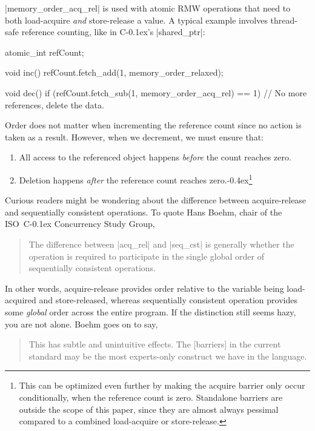 \documentclass[fontsize=10pt, oneside]{scrartcl}
\newcommand{\punckern}{\kern-0.4ex}
\newcommand{\cplusplus}[1]{C\kern-0.1ex\raisebox{0.15ex}{\texttt{++}}}
\begin{document}
\cc|memory_order_acq_rel| is used with atomic \textsc{RMW} operations that need to both load-acquire \emph{and} store-release a value.
A typical example involves thread-safe reference counting,
like in \cplusplus{}'s \cpp|shared_ptr|:
\begin{cppcode}
atomic_int refCount;

void inc()
{
    refCount.fetch_add(1, memory_order_relaxed);
}
\end{cppcode}
\begin{cppcode}
void dec()
{
    if (refCount.fetch_sub(1, memory_order_acq_rel) == 1) {
        // No more references, delete the data.
    }
}
\end{cppcode}

Order does not matter when incrementing the reference count since no action is taken as a result.
However, when we decrement, we must ensure that:
\begin{enumerate}
  \item All access to the referenced object happens \emph{before} the count reaches zero.
  \item Deletion happens \emph{after} the reference count reaches zero.\punckern\footnote{%
        This can be optimized even further by making the acquire barrier only occur conditionally,
        when the reference count is zero.
        Standalone barriers are outside the scope of this paper,
        since they are almost always pessimal compared to a combined load-acquire or store-release.}
\end{enumerate}

Curious readers might be wondering about the difference between acquire-release and sequentially consistent operations.
To quote Hans Boehm, chair of the ISO~\cplusplus{} Concurrency Study Group,
\begin{quote}
\small
The difference between \cc|acq_rel| and \cc|seq_cst| is generally whether the operation is required to participate in the single global order of sequentially consistent operations.
\end{quote}
In other words, acquire-release provides order relative to the variable being load-acquired and store-released,
whereas sequentially consistent operation provides some \emph{global} order across the entire program.
If the distinction still seems hazy, you are not alone.
Boehm goes on to say,
\begin{quote}
\small
This has subtle and unintuitive effects.
The [barriers] in the current standard may be the most
experts-only construct we have in the language.
\end{quote}
\end{document}
